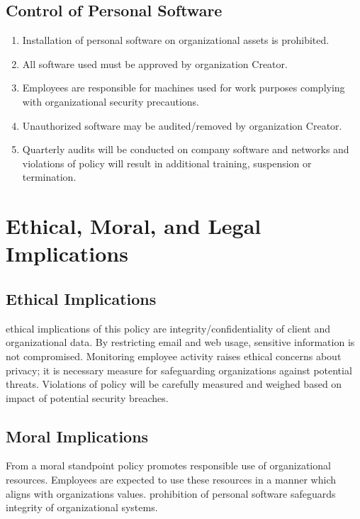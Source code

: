 \documentclass[12pt]{article}
\begin{document}
\subsection{Control of Personal Software}
 
\begin{enumerate}
    \item Installation of personal software on organizational assets is prohibited.
    \item All software used must be approved by organization Creator.
    \item Employees are responsible for machines used for work purposes complying with organizational security precautions.
    \item Unauthorized software may be audited/removed by organization Creator.
    \item Quarterly audits will be conducted on company software and networks and violations of policy will result in additional training, suspension or termination.
\end{enumerate}
 
\section{Ethical, Moral, and Legal Implications}
\label{sec:implications}
 
\subsection{Ethical Implications}
\label{subsec:ethical-implications}
 
ethical implications of this policy are integrity/confidentiality of client and organizational data. By restricting email and web usage, sensitive information is not compromised. Monitoring employee activity raises ethical concerns about privacy; it is necessary measure for safeguarding organizations against potential threats. Violations of policy will be carefully measured and weighed based on impact of potential security breaches.
 
\subsection{Moral Implications}
\label{subsec:moral-implications}
 
From a moral standpoint policy promotes responsible use of organizational resources. Employees are expected to use these resources in a manner which aligns with organizations values. prohibition of personal software safeguards integrity of organizational systems.
 
\end{document}
